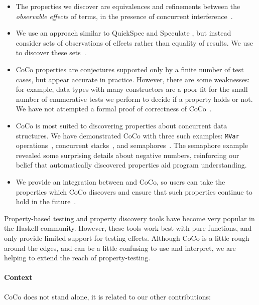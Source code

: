 \begin{itemize}
\item The properties we discover are equivalences and refinements
  between the \emph{observable effects} of terms, in the presence of
  concurrent interference~.

\item We use an approach similar to QuickSpec \parencite{smallbone2017} and
  Speculate \parencite{braquehais2017}, but instead consider sets of
  observations of effects rather than equality of results.  We use
  \dejafu{} to discover these sets~.

\item CoCo properties are conjectures supported only by a finite
  number of test cases, but appear accurate in practice.  However,
  there are some weaknesses: for example, data types with many
  constructors are a poor fit for the small number of enumerative
  tests we perform to decide if a property holds or not.  We have not
  attempted a formal proof of correctness of
  CoCo~.

\item CoCo is most suited to discovering properties about concurrent
  data structures.  We have demonstrated CoCo with three such
  examples: \verb|MVar| operations~, concurrent
  stacks~, and
  semaphores~.  The semaphore example
  revealed some surprising details about negative numbers, reinforcing
  our belief that automatically discovered properties aid program
  understanding.

\item We provide an integration between \dejafu{} and CoCo, so users
  can take the properties which CoCo discovers and ensure that such
  properties continue to hold in the future~.
\end{itemize}

Property-based testing and property discovery tools have become very
popular in the Haskell community.  However, these tools work best with
pure functions, and only provide limited support for testing effects.
Although CoCo is a little rough around the edges, and can be a little
confusing to use and interpret, we are helping to extend the reach of
property-testing.

\paragraph{Context}
CoCo does not stand alone, it is related to our other contributions:

